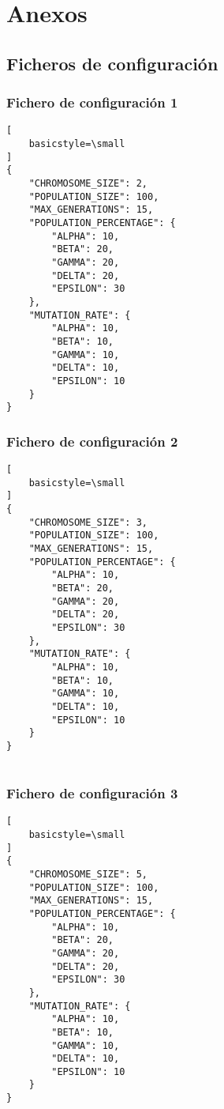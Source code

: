\chapter{Anexos}

\section{Ficheros de configuración} \label{subsect:config_file}

\subsection{Fichero de configuración 1} \label{subsect:config_file_1}

\begin{lstlisting}[
    basicstyle=\small
]
{
    "CHROMOSOME_SIZE": 2,
    "POPULATION_SIZE": 100,
    "MAX_GENERATIONS": 15,
    "POPULATION_PERCENTAGE": {
        "ALPHA": 10,
        "BETA": 20,
        "GAMMA": 20,
        "DELTA": 20,
        "EPSILON": 30
    },
    "MUTATION_RATE": {
        "ALPHA": 10,
        "BETA": 10,
        "GAMMA": 10,
        "DELTA": 10,
        "EPSILON": 10
    }
}

\end{lstlisting}

\subsection{Fichero de configuración 2} \label{subsect:config_file_2}

\begin{lstlisting}[
    basicstyle=\small
]
{
    "CHROMOSOME_SIZE": 3,
    "POPULATION_SIZE": 100,
    "MAX_GENERATIONS": 15,
    "POPULATION_PERCENTAGE": {
        "ALPHA": 10,
        "BETA": 20,
        "GAMMA": 20,
        "DELTA": 20,
        "EPSILON": 30
    },
    "MUTATION_RATE": {
        "ALPHA": 10,
        "BETA": 10,
        "GAMMA": 10,
        "DELTA": 10,
        "EPSILON": 10
    }
}
   
\end{lstlisting}

\subsection{Fichero de configuración 3} \label{subsect:config_file_3}

\begin{lstlisting}[
    basicstyle=\small
]
{
    "CHROMOSOME_SIZE": 5,
    "POPULATION_SIZE": 100,
    "MAX_GENERATIONS": 15,
    "POPULATION_PERCENTAGE": {
        "ALPHA": 10,
        "BETA": 20,
        "GAMMA": 20,
        "DELTA": 20,
        "EPSILON": 30
    },
    "MUTATION_RATE": {
        "ALPHA": 10,
        "BETA": 10,
        "GAMMA": 10,
        "DELTA": 10,
        "EPSILON": 10
    }
}
   
\end{lstlisting}

